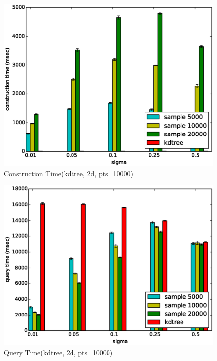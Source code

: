 \documentclass[mcs]{scsthesis}
\begin{document}
\begin{figure}
\begin{center}
\includegraphics[scale=0.5]{diagrams/kt_2d_pts10000_groupbysample_ctime.eps}
\caption{Construction Time(kdtree, 2d, pts=10000)}
\label{fig:sample_set_size_ctime}
\end{center}
\end{figure}

\begin{figure}
\begin{center}
\includegraphics[scale=0.5]{diagrams/kt_2d_pts10000_groupbysample_qtime.eps}
\caption{Query Time(kdtree, 2d, pts=10000)}
\label{fig:sample_set_size_qtime}
\end{center}
\end{figure}
\end{document}
